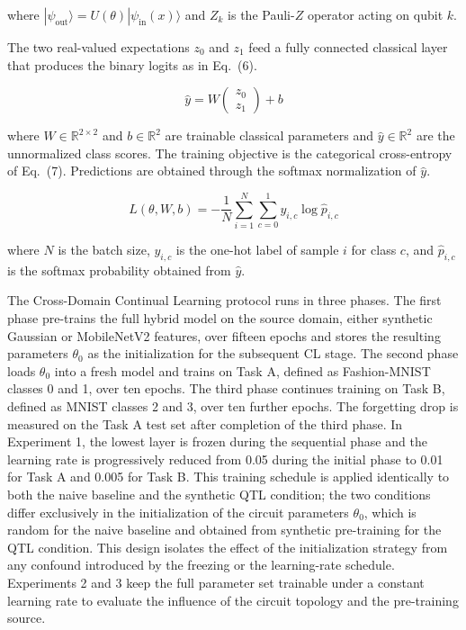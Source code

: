 \documentclass[conference]{IEEEtran}
\begin{document}
where $|\psi_{\text{out}}\rangle = U(\theta)|\psi_{\text{in}}(x)\rangle$ and $Z_k$ is the Pauli-$Z$ operator acting on qubit $k$.

The two real-valued expectations $z_0$ and $z_1$ feed a fully connected classical layer that produces the binary logits as in Eq.~(6).

\begin{equation}
\hat{y} = W \begin{pmatrix} z_0 \\ z_1 \end{pmatrix} + b
\end{equation}

where $W \in \mathbb{R}^{2\times 2}$ and $b \in \mathbb{R}^{2}$ are trainable classical parameters and $\hat{y} \in \mathbb{R}^{2}$ are the unnormalized class scores. The training objective is the categorical cross-entropy of Eq.~(7). Predictions are obtained through the softmax normalization of $\hat{y}$.

\begin{equation}
L(\theta, W, b) = -\frac{1}{N} \sum_{i=1}^{N} \sum_{c=0}^{1} y_{i,c} \log \hat{p}_{i,c}
\end{equation}

where $N$ is the batch size, $y_{i,c}$ is the one-hot label of sample $i$ for class $c$, and $\hat{p}_{i,c}$ is the softmax probability obtained from $\hat{y}$.

The Cross-Domain Continual Learning protocol runs in three phases. The first phase pre-trains the full hybrid model on the source domain, either synthetic Gaussian or MobileNetV2 features, over fifteen epochs and stores the resulting parameters $\theta_0$ as the initialization for the subsequent CL stage. The second phase loads $\theta_0$ into a fresh model and trains on Task A, defined as Fashion-MNIST classes 0 and 1, over ten epochs. The third phase continues training on Task B, defined as MNIST classes 2 and 3, over ten further epochs. The forgetting drop is measured on the Task A test set after completion of the third phase. In Experiment 1, the lowest layer is frozen during the sequential phase and the learning rate is progressively reduced from 0.05 during the initial phase to 0.01 for Task A and 0.005 for Task B. This training schedule is applied identically to both the naive baseline and the synthetic QTL condition; the two conditions differ exclusively in the initialization of the circuit parameters $\theta_0$, which is random for the naive baseline and obtained from synthetic pre-training for the QTL condition. This design isolates the effect of the initialization strategy from any confound introduced by the freezing or the learning-rate schedule. Experiments 2 and 3 keep the full parameter set trainable under a constant learning rate to evaluate the influence of the circuit topology and the pre-training source.
\end{document}
